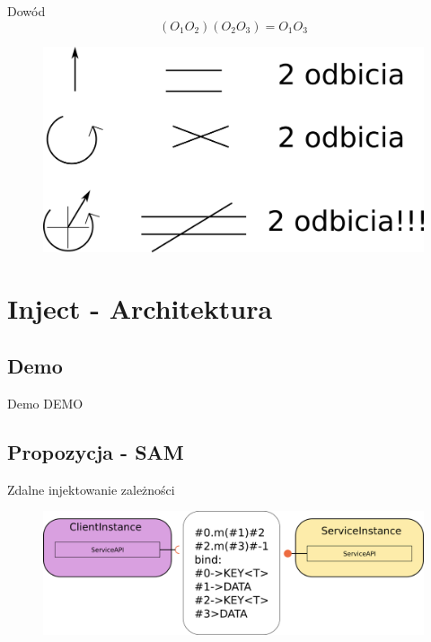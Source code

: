 \documentclass[smaller]{beamer}
\begin{document}
\begin{frame}{Dowód}
$$(O_1 O_2 ) (O_2 O_3) = O_1 O_3 $$

\begin{figure}
 \centering
 \includegraphics[width=1\textwidth]{rotationDowodFig}
\end{figure}

\end{frame}

\section{Inject - Architektura}
\subsection{Demo}

\begin{frame}{Demo}
 DEMO
\end{frame}



\subsection{Propozycja - SAM}
\begin{frame}{Zdalne injektowanie zależności}
\LstSimpleInjection
\pause

\begin{figure}
 \centering
 \includegraphics[width=1\textwidth]{canonicalSplit}
\end{figure}

\end{frame}
\end{document}
